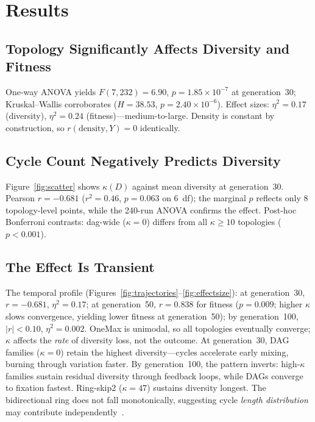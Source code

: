 \documentclass{llncs}
\begin{document}
\section{Results}
\label{sec:results}

\subsection{Topology Significantly Affects Diversity and Fitness}

One-way ANOVA yields $F(7, 232) = 6.90$, $p = 1.85 \times 10^{-7}$ at
generation~30; Kruskal--Wallis corroborates ($H = 38.53$,
$p = 2.40 \times 10^{-6}$). Effect sizes: $\eta^2 = 0.17$ (diversity),
$\eta^2 = 0.24$ (fitness)---medium-to-large. Density is constant by
construction, so $r(\text{density}, Y) = 0$ identically.

\subsection{Cycle Count Negatively Predicts Diversity}

Figure~\ref{fig:scatter} shows $\kappa(D)$ against mean diversity at
generation~30. Pearson $r = -0.681$ ($r^2 = 0.46$, $p = 0.063$ on 6~df);
the marginal $p$ reflects only 8 topology-level points, while the 240-run
ANOVA confirms the effect. Post-hoc Bonferroni contrasts: dag-wide
($\kappa = 0$) differs from all $\kappa \geq 10$ topologies ($p < 0.001$).

\subsection{The Effect Is Transient}

The temporal profile (Figures~\ref{fig:trajectories}--\ref{fig:effectsize}):
at generation~30, $r = -0.681$, $\eta^2 = 0.17$; at generation~50,
$r = 0.838$ for fitness ($p = 0.009$; higher $\kappa$ slows convergence,
yielding lower fitness at generation~50); by generation~100, $|r| < 0.10$,
$\eta^2 = 0.002$. OneMax is unimodal, so all topologies eventually converge;
$\kappa$ affects the \emph{rate} of diversity loss, not the outcome.
At generation~30, DAG families ($\kappa = 0$) retain the highest
diversity---cycles accelerate early mixing, burning through variation faster.
By generation~100, the pattern inverts: high-$\kappa$ families sustain
residual diversity through feedback loops, while DAGs converge to fixation
fastest. Ring-skip2 ($\kappa = 47$) sustains diversity longest. The
bidirectional ring does not fall monotonically, suggesting cycle
\emph{length distribution} may contribute independently~\cite{cycrak2024}.
\end{document}
